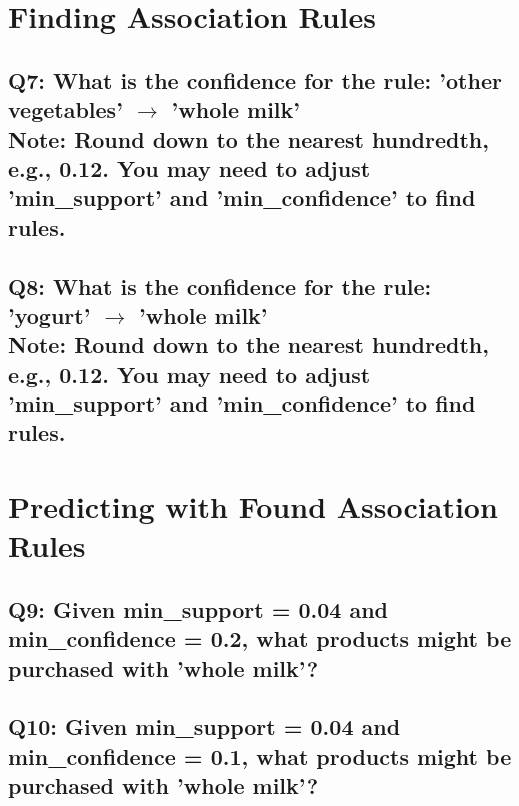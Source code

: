 \documentclass[]{article}
\begin{document}
\section*{Finding Association Rules}

\subsection*{Q7: What is the confidence for the rule: 'other vegetables' $\rightarrow$ 'whole milk' \\ Note: Round down to the nearest hundredth, e.g., 0.12. You may need to adjust 'min\_support' and 'min\_confidence' to find rules.}

\subsection*{Q8: What is the confidence for the rule: 'yogurt' $\rightarrow$ 'whole milk' \\	Note: Round down to the nearest hundredth, e.g., 0.12. You may need to adjust 'min\_support' and 'min\_confidence' to find rules.}

\section*{Predicting with Found Association Rules}

\subsection*{Q9: Given min\_support = 0.04 and min\_confidence = 0.2, what products might be purchased	with 'whole milk'?}

\subsection*{Q10: Given min\_support = 0.04 and min\_confidence = 0.1, what products might be purchased	with 'whole milk'?}
\end{document}
